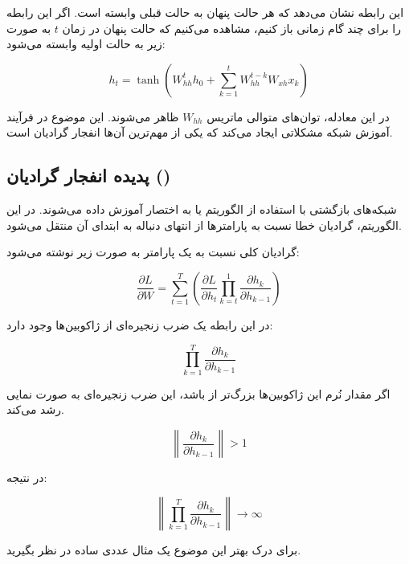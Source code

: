 \documentclass{article}
\begin{document}
این رابطه نشان می‌دهد که هر حالت پنهان به حالت قبلی وابسته است. 
اگر این رابطه را برای چند گام زمانی باز کنیم، مشاهده می‌کنیم که حالت پنهان در زمان \(t\) به صورت زیر به حالت اولیه وابسته می‌شود:

\begin{equation}
	h_t = \tanh(W_{hh}^t h_0 + \sum_{k=1}^{t} W_{hh}^{t-k} W_{xh} x_k)
\end{equation}

در این معادله، توان‌های متوالی ماتریس \(W_{hh}\) ظاهر می‌شوند. 
این موضوع در فرآیند آموزش شبکه مشکلاتی ایجاد می‌کند که یکی از مهم‌ترین آن‌ها انفجار گرادیان است.

\subsection{پدیده انفجار گرادیان ()}

شبکه‌های بازگشتی با استفاده از الگوریتم  یا به اختصار  آموزش داده می‌شوند. 
در این الگوریتم، گرادیان خطا نسبت به پارامترها از انتهای دنباله به ابتدای آن منتقل می‌شود.

گرادیان کلی نسبت به یک پارامتر به صورت زیر نوشته می‌شود:

\begin{equation}
	\frac{\partial L}{\partial W} =
	\sum_{t=1}^{T}
	\left(
	\frac{\partial L}{\partial h_t}
	\prod_{k=t}^{1}
	\frac{\partial h_k}{\partial h_{k-1}}
	\right)
\end{equation}

در این رابطه یک ضرب زنجیره‌ای از ژاکوبین‌ها وجود دارد:

\begin{equation}
	\prod_{k=1}^{T}
	\frac{\partial h_k}{\partial h_{k-1}}
\end{equation}

اگر مقدار نُرم این ژاکوبین‌ها بزرگ‌تر از  باشد، این ضرب زنجیره‌ای به صورت نمایی رشد می‌کند.

\begin{equation}
	\left\|
	\frac{\partial h_k}{\partial h_{k-1}}
	\right\| > 1
\end{equation}

در نتیجه:

\begin{equation}
	\left\|
	\prod_{k=1}^{T}
	\frac{\partial h_k}{\partial h_{k-1}}
	\right\|
	\rightarrow \infty
\end{equation}

برای درک بهتر این موضوع یک مثال عددی ساده در نظر بگیرید.
\end{document}
